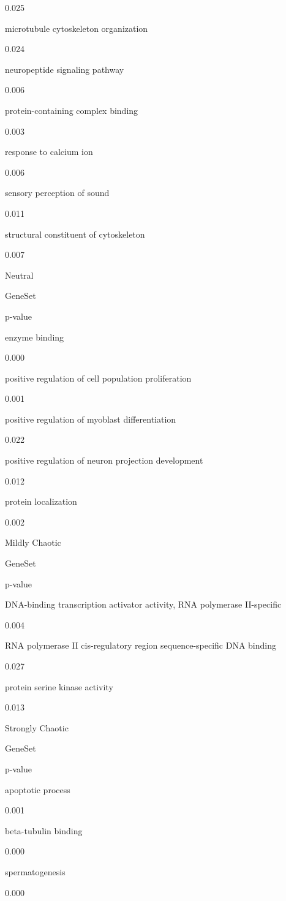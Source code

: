 \documentclass[
  letterpaper,
  DIV=11,
  numbers=noendperiod,
  openany,
  oneside]{scrreprt}
\begin{document}
0.025

microtubule cytoskeleton organization

0.024

neuropeptide signaling pathway

0.006

protein-containing complex binding

0.003

response to calcium ion

0.006

sensory perception of sound

0.011

structural constituent of cytoskeleton

0.007

Neutral

GeneSet

p-value

enzyme binding

0.000

positive regulation of cell population proliferation

0.001

positive regulation of myoblast differentiation

0.022

positive regulation of neuron projection development

0.012

protein localization

0.002

Mildly Chaotic

GeneSet

p-value

DNA-binding transcription activator activity, RNA polymerase II-specific

0.004

RNA polymerase II cis-regulatory region sequence-specific DNA binding

0.027

protein serine kinase activity

0.013

Strongly Chaotic

GeneSet

p-value

apoptotic process

0.001

beta-tubulin binding

0.000

spermatogenesis

0.000
\end{document}
